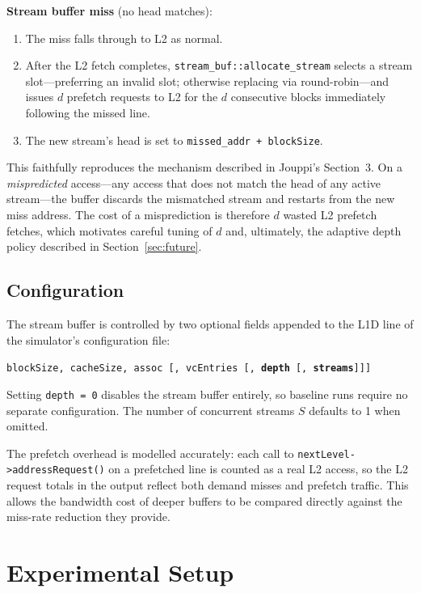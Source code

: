 \documentclass[10pt,twocolumn]{article}
\begin{document}
\textbf{Stream buffer miss} (no head matches):
\begin{enumerate}
  \item The miss falls through to L2 as normal.
  \item After the L2 fetch completes, \texttt{stream\_buf::allocate\_stream}
    selects a stream slot---preferring an invalid slot; otherwise
    replacing via round-robin---and issues $d$ prefetch requests to L2
    for the $d$ consecutive blocks immediately following the missed line.
  \item The new stream's head is set to \texttt{missed\_addr +
    blockSize}.
\end{enumerate}

This faithfully reproduces the mechanism described in Jouppi's Section~3.
On a \textit{mispredicted} access---any access that does not match the
head of any active stream---the buffer discards the mismatched stream
and restarts from the new miss address. The cost of a misprediction is
therefore $d$ wasted L2 prefetch fetches, which motivates careful tuning
of $d$ and, ultimately, the adaptive depth policy described in
Section~\ref{sec:future}.

\subsection{Configuration}

The stream buffer is controlled by two optional fields appended to the
L1D line of the simulator's configuration file:

\begin{center}
\texttt{blockSize, cacheSize, assoc [, vcEntries [, \textbf{depth} [, \textbf{streams}]]]}
\end{center}

Setting \texttt{depth = 0} disables the stream buffer entirely, so
baseline runs require no separate configuration. The number of concurrent
streams $S$ defaults to 1 when omitted.

The prefetch overhead is modelled accurately: each call to
\texttt{nextLevel->addressRequest()} on a prefetched line is counted
as a real L2 access, so the L2 request totals in the output reflect
both demand misses and prefetch traffic. This allows the bandwidth
cost of deeper buffers to be compared directly against the miss-rate
reduction they provide.

\section{Experimental Setup}
\end{document}
